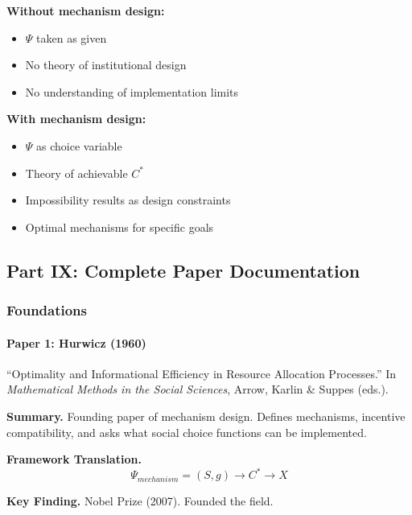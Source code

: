 \textbf{Without mechanism design:}
\begin{itemize}
    \item $\Psi$ taken as given
    \item No theory of institutional design
    \item No understanding of implementation limits
\end{itemize}

\textbf{With mechanism design:}
\begin{itemize}
    \item $\Psi$ as choice variable
    \item Theory of achievable $C^*$
    \item Impossibility results as design constraints
    \item Optimal mechanisms for specific goals
\end{itemize}

\subsection{Part IX: Complete Paper Documentation}

\subsubsection{Foundations}

\paragraph{Paper 1: Hurwicz (1960)}

``Optimality and Informational Efficiency in Resource Allocation Processes.''
In \textit{Mathematical Methods in the Social Sciences}, Arrow, Karlin \& Suppes (eds.).

\textbf{Summary.}
Founding paper of mechanism design. Defines mechanisms, incentive compatibility, 
and asks what social choice functions can be implemented.

\textbf{Framework Translation.}
\begin{equation}
\Psi_{mechanism} = (S, g) \to C^* \to X
\end{equation}

\textbf{Key Finding.}
Nobel Prize (2007). Founded the field.

